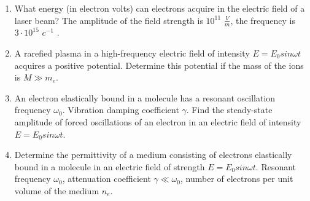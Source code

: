 \documentclass{article}
\begin{document}
\begin{enumerate}[label=7.3.\arabic*]
\item  What energy (in electron volts) can electrons acquire in the electric field of a laser beam? The amplitude of the field strength is $10^{11}$ $\frac{V}{m}$, the frequency is $3 \cdot 10^{15}$ $c^{-1}$ .

\item A rarefied plasma in a high-frequency electric field of intensity $E = E_0 sin \omega t$ acquires a positive potential. Determine this potential if the mass of the ions is $M \gg m_e$.

\item An electron elastically bound in a molecule has a resonant oscillation frequency $\omega_0$. Vibration damping coefficient $\gamma$. Find the steady-state amplitude of forced oscillations of an electron in an electric field of intensity $E = E_0 sin \omega t$.



\item Determine the permittivity of a medium consisting of electrons elastically bound in a molecule in an electric field of strength $E = E_0 sin \omega t$. Resonant frequency $\omega_0$, attenuation coefficient $\gamma \ll \omega_0$, number of electrons per unit volume of the medium $n_e$.


\end{enumerate}
\end{document}
